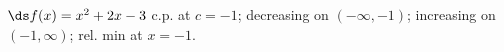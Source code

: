 {$\ds f(x) =x^2+2x-3$
}
{c.p. at $c=-1$; 
decreasing on $(-\infty,-1)$;
increasing on $(-1,\infty)$;
rel. min at $x=-1$.
}
